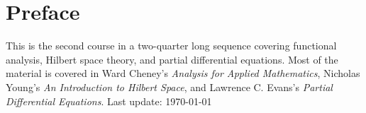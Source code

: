 \documentclass[10pt,oneside,openany]{memoir}
\begin{document}
\chapter*{Preface}
\vspace{-35pt}
This is the second course in a two-quarter long sequence covering functional analysis, Hilbert space theory, and partial differential equations. Most of the material is covered in Ward Cheney's \textit{Analysis for Applied Mathematics}, Nicholas Young's \textit{An Introduction to Hilbert Space}, and Lawrence C. Evans's \textit{Partial Differential Equations}.
\vspace{-35pt}
\tableofcontents
\vfill
\specialdate
Last update: \today

%



\end{document}
